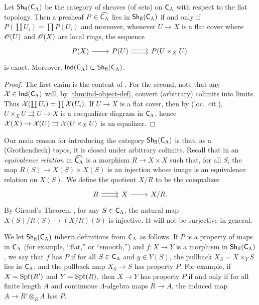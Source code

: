 \documentclass[phd,cornellheadings,draft]{cornell}
\begin{document}
\begin{lemma}
Let $\operatorname{\mathsf{Sh}}_{\mathrm{fl}}(\mathsf{C}_\Lambda)$ be the category of sheaves (of sets) on 
$\mathsf{C}_\Lambda$ with respect to the flat topology. Then a presheaf 
$P\in \widehat{\mathsf{C}_\Lambda}$ lies in $\operatorname{\mathsf{Sh}}_{\mathrm{fl}}(\mathsf{C}_\Lambda)$ if 
and only if $P(\coprod U_i) = \prod P(U_i)$ and moreover, whenever 
$U \to X$ is a flat cover where $\mathscr{O}(U)$ and $\mathscr{O}(X)$ are local rings, the 
sequence 
\[
\begin{tikzcd}
	P(X) \ar[r]
		& P(U) \ar[r, shift left=.5ex] \ar[r, shift right=.5ex]
		& P(U\times_X U) .
\end{tikzcd}
\]
is exact. Moreover, 
$\operatorname{\mathsf{Ind}}(\mathsf{C}_\Lambda)\subset \operatorname{\mathsf{Sh}}_{\mathrm{fl}}(\mathsf{C}_\Lambda)$. 
\end{lemma}
\begin{proof}
The first claim is the content of \cite[IV 6.3.1(ii)]{sga3-1}. For the second, 
note that any $\mathcal{X}\in \operatorname{\mathsf{Ind}}(\mathsf{C}_\Lambda)$ will, by 
\ref{thm:ind-object-def}, convert (arbitrary) colimits into limits. Thus 
$\mathcal{X}(\coprod U_i) = \prod \mathcal{X}(U_i)$. If $U\to X$ is a flat cover, then by (loc.~cit.), $U\times_X U\rightrightarrows U\to X$ is a coequalizer diagram in 
$\mathsf{C}_\Lambda$, hence 
$\mathcal{X}(X)\to \mathcal{X}(U)\rightrightarrows \mathcal{X}(U\times_X U)$ is an equalizer. 
\end{proof}

Our main reason for introducing the category $\operatorname{\mathsf{Sh}}_{\mathrm{fl}}(\mathsf{C}_\Lambda)$ 
is that, as a (Grothendieck) topos, it is closed under arbitrary colimits. 
Recall that in an \emph{equivalence relation} in $\widehat{\mathsf{C}_\Lambda}$ 
is a morphism $R\to X\times X$ such that, for all $S$, the map 
$R(S)\to X(S)\times X(S)$ is an injection whose image is an equivalence 
relation on $X(S)$. We define the quotient $X/R$ to be the coequalizer 
\[
\begin{tikzcd}
	R \ar[r, shift left=.5ex] \ar[r, shift right=.5ex]
		& X \ar[r]
		& X/R .
\end{tikzcd}
\]
By Giraud's Theorem \cite[App.]{maclane-moerdijk-1994}, for any 
$S\in \mathsf{C}_\Lambda$, the natural map $X(S)/R(S)\to (X/R)(S)$ is injective. 
It will not be surjective in general. 

We let $\operatorname{\mathsf{Sh}}_{\mathrm{fl}}(\mathsf{C}_\Lambda)$ inherit definitions from 
$\mathsf{C}_\Lambda$ as follows. If $P$ is a property of maps in 
$\mathsf{C}_\Lambda$ (for example, ``flat,'' or ``smooth,'') and 
$f\colon X\to Y$ is a morphism in $\operatorname{\mathsf{Sh}}_{\mathrm{fl}}(\mathsf{C}_\Lambda)$, we say 
that $f$ has $P$ if for all $S\in \mathsf{C}_\Lambda$ and $y\in Y(S)$, the 
pullback $X_S=X\times_Y S$ lies in $\mathsf{C}_\Lambda$, and the pullback map 
$X_S\to S$ has property $P$. For example, if $X=\operatorname{Spf}(R')$ and $Y=\operatorname{Spf}(R)$, then 
$X\to Y$ has property $P$ if and only if for all finite length $A$ and 
continuous $\Lambda$-algebra maps $R\to A$, the induced map 
$A\to R'\otimes_R A$ has $P$.
\end{document}
